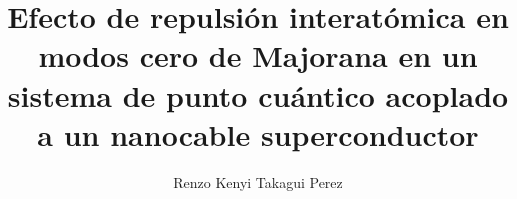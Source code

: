 \documentclass[12pt,screen,twoside,pagebackref]{ibtesis}
\title{Efecto de repulsi\'{o}n interat\'{o}mica en modos cero de Majorana en un sistema de punto cu\'{a}ntico acoplado a un nanocable superconductor}
\author{Renzo Kenyi Takagui Perez}
\begin{document}
\begin{preliminary}




\tableofcontents                %




\end{preliminary}


%
%
%
%





%
%



\begin{biblio}

\end{biblio}




\end{document}
